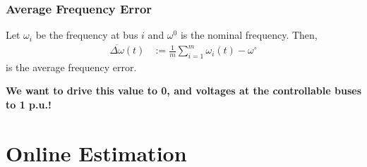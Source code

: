 \documentclass[
    aspectratio=169,
    \ifdefined\HANDOUT
    handout
    \else
    \fi
]{beamer}
\begin{document}
\begin{frame}
    \frametitle{Average Frequency Error}
    Let $\omega_i$ be the frequency at bus $i$ and $\omega^0$ is the nominal frequency. Then,
    \begin{align*}
        \overline{\Delta \omega}(t) & := \frac{1}{m}\sum_{i=1}^{m}\omega_i(t)-\omega^{\circ}
    \end{align*}
    is the average frequency error.
    \begin{center}
        \textbf{We want to drive this value to 0, and voltages at the controllable buses to 1 p.u.!}
    \end{center}
\end{frame}

\section{Online Estimation}
\end{document}
